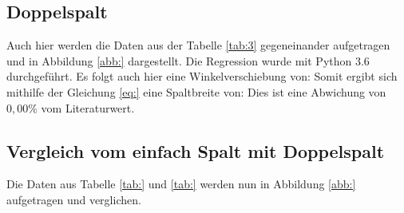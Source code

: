 \subsection{Doppelspalt}
Auch hier werden die Daten aus der Tabelle \ref{tab:3} gegeneinander aufgetragen und in Abbildung
\ref{abb:} dargestellt.
Die Regression wurde mit Python 3.6 durchgeführt.
Es folgt auch hier eine Winkelverschiebung von:
Somit ergibt sich mithilfe der Gleichung \ref{eq:} eine Spaltbreite von:
Dies ist eine Abwichung von $0,00\%$ vom Literaturwert.
\subsection{Vergleich vom einfach Spalt mit Doppelspalt}
Die Daten aus Tabelle \ref{tab:} und \ref{tab:} werden nun in Abbildung \ref{abb:}
aufgetragen und verglichen.
